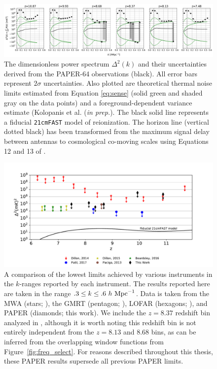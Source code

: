 \begin{figure}[tp]
\centering
\includegraphics[width=\textwidth]{plots/pspec_flagged_ants_delta2.pdf}
\caption{The dimensionless power spectrum $\Delta^{2}(k)$ and their uncertainties derived from the PAPER-64 observations (black).
All error bars represent $ 2\sigma $ uncertainties. Also plotted are theoretical thermal noise limits estimated from Equation \eqref{eq:sense} (solid green and shaded gray on the data points) and a foreground-dependent variance estimate (Kolopanis et al. (\textit{in prep.}).
The black solid line represents a fiducial \texttt{21cmFAST} model of reionization.
The horizon line (vertical dotted black) has been transformed from the maximum
signal delay between antennas to cosmological co-moving scales using Equations 12 and 13  of \citet{liu_et_al2014a}. }
\label{fig:pspec_delta2}
\end{figure}

 \begin{figure}[tp]
\centering
\includegraphics[width=.95\textwidth]{plots/eor_lowest_limits.pdf}
\caption{A comparison of the lowest limits achieved by various instruments in the $k$-ranges reported by each instrument.
The results reported here are taken in the range
$.3 \leq k \leq .6\ h\ {\rm Mpc}^{-1}$. Data is taken
from the MWA (stars; \cite{dillon_et_al2013b,dillon_et_al2015,beardsley_et_al2016}),
the GMRT (pentagon; \cite{paciga_et_al2013}),
LOFAR (hexagons; \cite{patil_et_al2017}),
and PAPER (diamonds; this work).
We include the $z=8.37$ redshift bin analyzed in \citet{ali_et_al2015}, although
it is worth noting this redshift bin is not entirely independent
from the $z=8.13$ and $8.68$ bins, as can be inferred from the
overlapping window functions from Figure~\ref{fig:freq_select}.
For reasons described throughout this thesis,
these PAPER results supersede all previous PAPER limits.
\label{fig:eor_summary}}
\end{figure}


